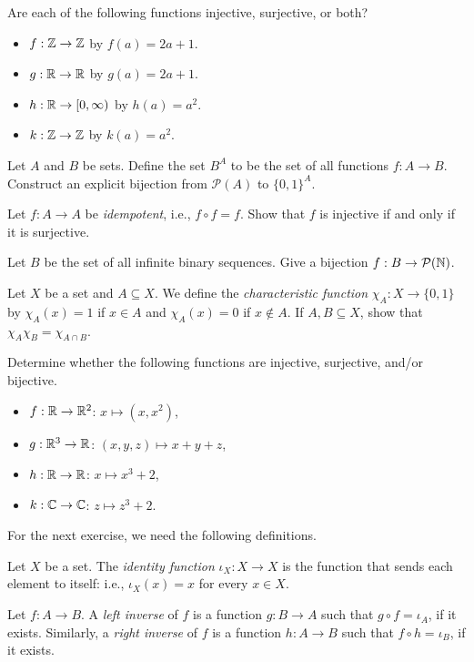 \documentclass{article}
\begin{document}
\begin{exercise}
Are each of the following functions injective, surjective, or both?
\begin{itemize}
    \item[(a)] $f: \mathbb Z\to \mathbb Z$ by $f(a) = 2a+1$.
    \item[(b)] $g: \mathbb R\to \mathbb R$ by $g(a) = 2a+1$.
    \item[(c)] $h: \mathbb R\to [0, \infty)$ by $h(a) = a^2$.
    \item[(d)] $k: \mathbb Z\to \mathbb Z$ by $k(a) = a^2$.
\end{itemize}
\end{exercise}
\begin{exercise}
Let $A$ and $B$ be sets. Define the set $B^A$ to be the set of all functions $f: A\to B$. Construct an explicit bijection from $\mathcal P(A)$ to $\{0,1\}^A$.
\end{exercise}
\begin{exercise}
Let $f: A\to A$ be \textit{idempotent}, i.e., $f\circ f = f$. Show that $f$ is injective if and only if it is surjective.
\end{exercise}
\begin{exercise}
Let $B$ be the set of all infinite binary sequences. Give a bijection $f: B\to \mathcal P(\mathbb N)$. 
\end{exercise}
\begin{exercise}
Let $X$ be a set and $A\subseteq X$. We define the \textit{characteristic function} $\chi_A: X\to \{0, 1\}$ by $\chi_A(x) = 1$ if $x\in A$ and $\chi_A(x) = 0$ if $x\not\in A$. If $A,B\subseteq X$, show that $\chi_A\chi_B = \chi_{A\cap B}$.
\end{exercise}
\begin{exercise}
Determine whether the following functions are injective, surjective, and/or bijective.
\begin{itemize}
    \item[(a)] $f: \mathbb R\to \mathbb R^2$: $x\mapsto (x, x^2)$,
    \item[(b)] $g: \mathbb R^3\to\mathbb R$: $(x,y,z)\mapsto x+y + z$,
    \item[(c)] $h:\mathbb R\to\mathbb R$: $x\mapsto x^3+2$,
    \item[(d)] $k:\mathbb C\to\mathbb C$: $z\mapsto z^3+2$.
\end{itemize}
\end{exercise}

For the next exercise, we need the following definitions.
\begin{definition}
Let $X$ be a set. The \textit{identity function} $\iota_X: X\to X$ is the function that sends each element to itself: i.e., $\iota_X(x) = x$ for every $x\in X$.
\end{definition}
\begin{definition}
Let $f: A\to B$. A \textit{left inverse} of $f$ is a function $g: B\to A$ such that $g\circ f = \iota_A$, if it exists. Similarly, a \textit{right inverse} of $f$ is a function $h: A\to B$ such that $f\circ h = \iota_B$, if it exists.
\end{definition}
\end{document}
